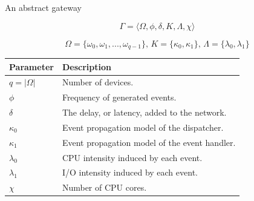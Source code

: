 \documentclass{beamer}
\begin{document}
    \begin{frame}{An abstract gateway}

        $$
        \Gamma = \big \langle \Omega, \phi, \delta, K, \Lambda, \chi \big
        \rangle
        $$

        $$
        \Omega = \{ \omega_0, \omega_1, ..., \omega_{q-1} \} \text{, }
        K = \{ \kappa_0, \kappa_1 \} \text{, }
        \Lambda = \{ \lambda_0, \lambda_1 \}
        $$

        \begin{table}[h!]
            \begin{center}
                \begin{tabular}{|l|l|}
                    \hline
                    Parameter   & Description \\
                    \hline
                    $q = |\Omega|$         & Number of devices. \\
                    $\phi$      & Frequency of generated events. \\
                    $\delta$    & The delay, or latency, added to the network. \\
                    $\kappa_0$  & Event propagation model of the dispatcher. \\
                    $\kappa_1$  & Event propagation model of the event handler. \\
                    $\lambda_0$ & CPU intensity induced by each event. \\
                    $\lambda_1$ & I/O intensity induced by each event. \\
                    $\chi$      & Number of CPU cores. \\
                    \hline
                \end{tabular}
            \end{center}
        \end{table}

    \end{frame}
\end{document}
